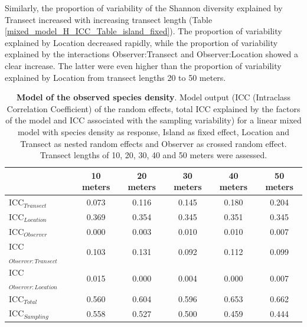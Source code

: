 \documentclass[10pt,letterpaper]{article}
\begin{document}
Similarly, the proportion of variability of the Shannon diversity explained by Transect increased with increasing transect length (Table \ref{mixed_model_H_ICC_Table_island_fixed}). The proportion of variability explained by Location decreased rapidly, while the proportion of variability explained by the interactions Observer:Transect and Observer:Location showed a clear increase. The latter were even higher than the proportion of variability explained by Location from transect lengths 20 to 50 meters. 

\renewcommand{\arraystretch}{1.25}
\begin{table}
\centering
\scriptsize
\caption{{\bf Model of the observed species density}. Model output (ICC (Intraclass Correlation Coefficient) of the random effects, total ICC explained by the factors of the model and ICC associated with the sampling variability) for a linear mixed model with species density as response, Island as fixed effect, Location and Transect as nested random effects and Observer as crossed random effect. Transect lengths of 10, 20, 30, 40 and 50 meters were assessed.}
\label{mixed_model_SR_ICC_Table_island_fixed}
\begin{tabular}{l|ccccc} 
\toprule
                  & 10 meters               & 20 meters               & 30 meters               & 40 meters               & 50 meters                \\ 
\midrule
ICC$_{Transect}$          & 0.073                  & 0.116                  & 0.145                  & 0.180                  & 0.204                   \\ 
ICC$_{Location}$          & 0.369                  & 0.354                  & 0.345                  & 0.351                  & 0.345                   \\ 
ICC$_{Observer}$          & 0.000                  & 0.003                  & 0.010                  & 0.010                  & 0.007                   \\ 
ICC$_{Observer:Transect}$ & 0.103                  & 0.131                  & 0.092                  & 0.112                  & 0.099                   \\ 
ICC$_{Observer:Location}$ & 0.015                  & 0.000                  & 0.004                  & 0.000                  & 0.007                   \\ 
ICC$_{Total}$             & 0.560                  & 0.604                  & 0.596                  & 0.653                  & 0.662                   \\
ICC$_{Sampling}$             & 0.558                  & 0.527                  & 0.500                  & 0.459                  & 0.444                   \\
\bottomrule
\end{tabular}
\end{table}
\renewcommand{\arraystretch}{1}
\end{document}
